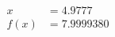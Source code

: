 \documentclass[preview]{standalone}
\begin{document}
\begin{align*}
x &= 4.9777\\f(x) &= 7.9999380
\end{align*}
\end{document}
